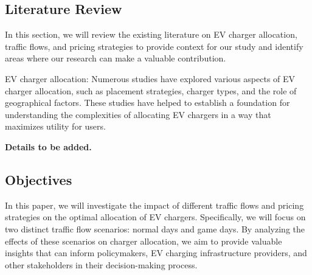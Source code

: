 \subsection{Literature Review}
In this section, we will review the existing literature on EV charger allocation, traffic flows, and pricing strategies to provide context for our study and identify areas where our research can make a valuable contribution.

EV charger allocation: Numerous studies have explored various aspects of EV charger allocation, such as placement strategies, charger types, and the role of geographical factors. These studies have helped to establish a foundation for understanding the complexities of allocating EV chargers in a way that maximizes utility for users.

\textbf{Details to be added.}

\subsection{Objectives}
In this paper, we will investigate the impact of different traffic flows and pricing strategies on the optimal allocation of EV chargers. Specifically, we will focus on two distinct traffic flow scenarios: normal days and game days. By analyzing the effects of these scenarios on charger allocation, we aim to provide valuable insights that can inform policymakers, EV charging infrastructure providers, and other stakeholders in their decision-making process.
